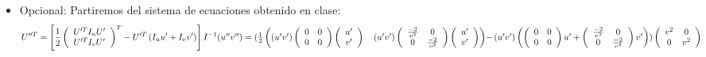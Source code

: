 \documentclass[12pt,a4paper]{article}
\begin{document}
\begin{enumerate}
\begin{center}
  \end{center}
  \begin{itemize}
     \item Opcional:
       Partiremos del sistema de ecuaciones obtenido en clase:
       \begin{equation*}
           U''^{T} = \left[ \frac{1}{2}
             \left( 
               \begin{array}{c}
                 U'^{T}I_{u}U' \\
                 U'^{T}I_{v}U'
               \end{array}\right)^{T}-U'^{T}\left(I_{u}u'+I_{v}v'\right)\right]I^{-1} $$\\ \\
           $$\left(u'' v''\right) = ( \frac{1}{2}
             \left(
               \left(u' v'\right)
               \left(
                 \begin{array}{cc}
                   0 & 0 \\ 
                   0 & 0 
                 \end{array}\right)
               \left(
                 \begin{array} {c}
                   u' \\
                   v' 
                 \end{array}\right)\ \ \ \left(u' v'\right)
               \left(
                 \begin{array} {cc}
                   \frac{-2}{v^{3}} & 0 \\ 
                   0 &  \frac{-2}{v^{3}} 
                 \end{array}\right)
               \left(
                 \begin{array}{c}
                   u' \\ 
                   v' 
                 \end{array} \right) \right)
             $$$$ -
             \left(u' v'\right)
             \left(
               \left(
                 \begin{array}{cc}
                   0 & 0 \\ 
                   0 & 0 
                 \end{array}\right)u'
               +
               \left(
                 \begin{array}{cc}
                   \frac{-2}{v^{3}} & 0 \\ 
                   0 & \frac{-2}{v^{3}} 
                 \end{array}\right)v'\right))
           \left(
             \begin{array}{cc} 
               v^{2} & 0 \\ 
               0 & v^{2} 
             \end{array}\right)
       \end{equation*}
       

\end{itemize}
\end{enumerate}
\end{document}
